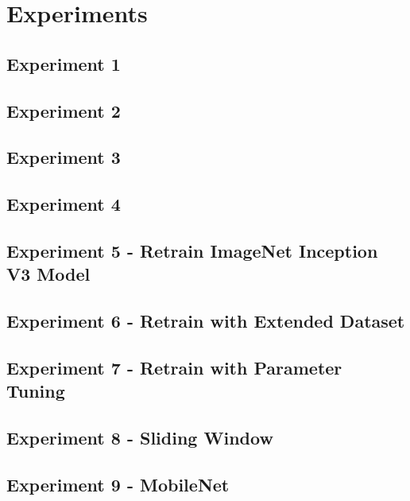 \chapter{Experiments}
\label{exp}

\section{Experiment 1}


\section{Experiment 2}


\section{Experiment 3}


\section{Experiment 4}


\section{Experiment 5 - Retrain ImageNet Inception V3 Model}


\section{Experiment 6 - Retrain with Extended Dataset}


\section{Experiment 7 - Retrain with Parameter Tuning}


\section{Experiment 8 - Sliding Window}


\section{Experiment 9 - MobileNet}


